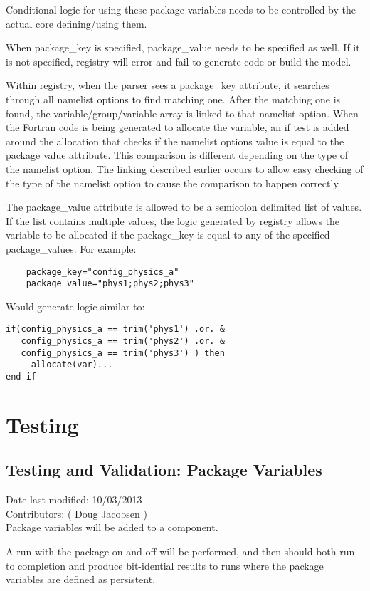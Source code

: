 \documentclass[11pt]{report}
\begin{document}
Conditional logic for using these package variables needs to be controlled by
the actual core defining/using them.

When package\_key is specified, package\_value needs to be specified as well.
If it is not specified, registry will error and fail to generate code or build
the model.

Within registry, when the parser sees a package\_key attribute, it searches
through all namelist options to find matching one. After the matching one is
found, the variable/group/variable array is linked to that namelist option.
When the Fortran code is being generated to allocate the variable, an if test
is added around the allocation that checks if the namelist options value is
equal to the package value attribute. This comparison is different depending on
the type of the namelist option. The linking described earlier occurs to allow
easy checking of the type of the namelist option to cause the comparison to
happen correctly.

The package\_value attribute is allowed to be a semicolon delimited list of
values. If the list contains multiple values, the logic generated by registry
allows the variable to be allocated if the package\_key is equal to any of the
specified package\_values. For example:
\begin{lstlisting}
	package_key="config_physics_a"
	package_value="phys1;phys2;phys3"
\end{lstlisting}

Would generate logic similar to:
\begin{lstlisting}
if(config_physics_a == trim('phys1') .or. &
   config_physics_a == trim('phys2') .or. &
   config_physics_a == trim('phys3') ) then
     allocate(var)...
end if
\end{lstlisting}


\chapter{Testing}

\section{Testing and Validation: Package Variables}
Date last modified: 10/03/2013 \\
Contributors: ( Doug Jacobsen ) \\

Package variables will be added to a component.

A run with the package on and off will be performed, and then should both run
to completion and produce bit-idential results to runs where the package
variables are defined as persistent.

\end{document}
